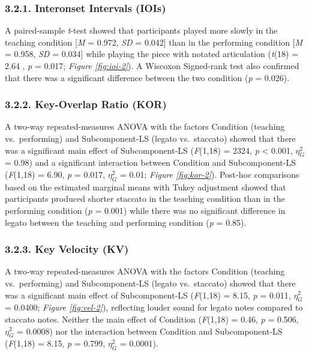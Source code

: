 \documentclass[
  english,
  man,floatsintext]{apa6}
\begin{document}
\hypertarget{interonset-intervals-iois-2}{%
\subsubsection{3.2.1. Interonset Intervals (IOIs)}\label{interonset-intervals-iois-2}}

A paired-sample \emph{t}-test showed that participants played more slowly in the teaching condition {[}\emph{M} = 0.972, \emph{SD} = 0.042{]} than in the performing condition {[}\emph{M} = 0.958, \emph{SD} = 0.034{]} while playing the piece with notated articulation (\emph{t}(18) = 2.64
, \emph{p} = 0.017; \emph{Figure \ref{fig:ioi-2}}). A Wiscoxon Signed-rank test also confirmed that there was a significant difference between the two condition (\emph{p} = 0.026).

\hypertarget{key-overlap-ratio-kor}{%
\subsubsection{3.2.2. Key-Overlap Ratio (KOR)}\label{key-overlap-ratio-kor}}

A two-way repeated-measures ANOVA with the factors Condition (teaching vs.~performing) and Subcomponent-LS (legato vs.~staccato) showed that there was a significant main effect of Subcomponent-LS (\emph{F}(1,18) = 2324, \emph{p} \textless{} 0.001, \(\eta_G^2\) = 0.98) and a significant interaction between Condition and Subcomponent-LS (\emph{F}(1,18) = 6.90, \emph{p} = 0.017, \(\eta_G^2\) = 0.01; \emph{Figure \ref{fig:kor-2}}). Post-hoc comparisons based on the estimated marginal means with Tukey adjustment showed that participants produced shorter staccato in the teaching condition than in the performing condition (\emph{p} = 0.001) while there was no significant difference in legato between the teaching and performing condition (\emph{p} = 0.85).

\hypertarget{key-velocity-kv-2}{%
\subsubsection{3.2.3. Key Velocity (KV)}\label{key-velocity-kv-2}}

A two-way repeated-measures ANOVA with the factors Condition (teaching vs.~performing) and Subcomponent-LS (legato vs.~staccato) showed that there was a significant main effect of Subcomponent-LS (\emph{F}(1,18) = 8.15, \emph{p} = 0.011, \(\eta_G^2\) = 0.0400; \emph{Figure \ref{fig:vel-2}}), reflecting louder sound for legato notes compared to staccato notes. Neither the main effect of Condition (\emph{F}(1,18) = 0.46, \emph{p} = 0.506, \(\eta_G^2\) = 0.0008) nor the interaction between Condition and Subcomponent-LS (\emph{F}(1,18) = 8.15, \emph{p} = 0.799, \(\eta_G^2\) = 0.0001).
\end{document}
